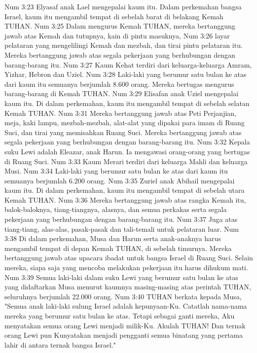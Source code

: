 Num 3:23  Elyasaf anak Lael mengepalai kaum itu. Dalam perkemahan bangsa Israel, kaum itu mengambil tempat di sebelah barat di belakang Kemah TUHAN.
Num 3:25  Dalam mengurus Kemah TUHAN, mereka bertanggung jawab atas Kemah dan tutupnya, kain di pintu masuknya,
Num 3:26  layar pelataran yang mengelilingi Kemah dan mezbah, dan tirai pintu pelataran itu. Mereka bertanggung jawab atas segala pekerjaan yang berhubungan dengan barang-barang itu.
Num 3:27  Kaum Kehat terdiri dari keluarga-keluarga Amram, Yizhar, Hebron dan Uziel.
Num 3:28  Laki-laki yang berumur satu bulan ke atas dari kaum itu semuanya berjumlah 8.600 orang. Mereka bertugas mengurus barang-barang di Kemah TUHAN.
Num 3:29  Elisafan anak Uziel mengepalai kaum itu. Di dalam perkemahan, kaum itu mengambil tempat di sebelah selatan Kemah TUHAN.
Num 3:31  Mereka bertanggung jawab atas Peti Perjanjian, meja, kaki lampu, mezbah-mezbah, alat-alat yang dipakai para imam di Ruang Suci, dan tirai yang memisahkan Ruang Suci. Mereka bertanggung jawab atas segala pekerjaan yang berhubungan dengan barang-barang itu.
Num 3:32  Kepala suku Lewi adalah Eleazar, anak Harun. Ia mengawasi orang-orang yang bertugas di Ruang Suci.
Num 3:33  Kaum Merari terdiri dari keluarga Mahli dan keluarga Musi.
Num 3:34  Laki-laki yang berumur satu bulan ke atas dari kaum itu semuanya berjumlah 6.200 orang.
Num 3:35  Zuriel anak Abihail mengepalai kaum itu. Di dalam perkemahan, kaum itu mengambil tempat di sebelah utara Kemah TUHAN.
Num 3:36  Mereka bertanggung jawab atas rangka Kemah itu, balok-baloknya, tiang-tiangnya, alasnya, dan semua perkakas serta segala pekerjaan yang berhubungan dengan barang-barang itu.
Num 3:37  Juga atas tiang-tiang, alas-alas, pasak-pasak dan tali-temali untuk pelataran luar.
Num 3:38  Di dalam perkemahan, Musa dan Harun serta anak-anaknya harus mengambil tempat di depan Kemah TUHAN, di sebelah timurnya. Mereka bertanggung jawab atas upacara ibadat untuk bangsa Israel di Ruang Suci. Selain mereka, siapa saja yang mencoba melakukan pekerjaan itu harus dihukum mati.
Num 3:39  Semua laki-laki dalam suku Lewi yang berumur satu bulan ke atas yang didaftarkan Musa menurut kaumnya masing-masing atas perintah TUHAN, seluruhnya berjumlah 22.000 orang.
Num 3:40  TUHAN berkata kepada Musa, "Semua anak laki-laki sulung Israel adalah kepunyaan-Ku. Catatlah nama-nama mereka yang berumur satu bulan ke atas. Tetapi sebagai ganti mereka, Aku menyatakan semua orang Lewi menjadi milik-Ku. Akulah TUHAN! Dan ternak orang Lewi pun Kunyatakan menjadi pengganti semua binatang yang pertama lahir di antara ternak bangsa Israel."
